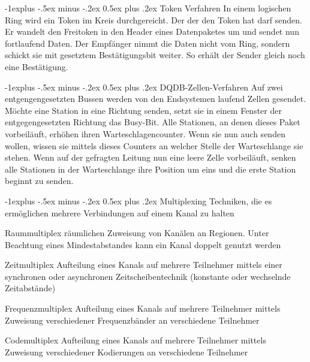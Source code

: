\documentclass[a4paper]{article}
\makeatletter
\renewcommand{\subsection}{\@startsection{subsection}{2}{0mm}%
                                {-1explus -.5ex minus -.2ex}%
                                {0.5ex plus .2ex}%
                                {\normalfont\normalsize\bfseries}}
\makeatother
\begin{document}
\begin{multicols}{3}
    \subsection{Token Verfahren}
    In einem logischen Ring wird ein Token im Kreis durchgereicht. Der der den Token hat darf senden. Er wandelt den Freitoken in den Header eines Datenpaketes um und sendet nun fortlaufend Daten. Der Empfänger nimmt die Daten nicht vom Ring, sondern schickt sie mit gesetztem Bestätigungsbit weiter. So erhält der Sender gleich noch eine Bestätigung.
    
    \subsection{DQDB-Zellen-Verfahren}
    Auf zwei entgengengesetzten Bussen werden von den Endsystemen laufend Zellen gesendet. Möchte eine Station in eine Richtung senden, setzt sie in einem Fenster der entgegengesetzten Richtung das Busy-Bit. Alle Stationen, an denen dieses Paket vorbeiläuft, erhöhen ihren Warteschlagencounter. Wenn sie nun auch senden wollen, wissen sie mittels dieses Counters an welcher Stelle der Warteschlange sie stehen. Wenn auf der gefragten Leitung nun eine leere Zelle vorbeiläuft, senken alle Stationen in der Warteschlange ihre Position um eins und die erste Station beginnt zu senden.
    
    \subsection{Multiplexing}
    Techniken, die es ermöglichen mehrere Verbindungen auf einem Kanal zu halten
    \begin{description*}
        \item[Raummultiplex] räumlichen Zuweisung von Kanälen an Regionen. Unter Beachtung eines Mindestabstandes kann ein Kanal doppelt genutzt werden
        \item[Zeitmultiplex] Aufteilung eines Kanals auf mehrere Teilnehmer mittels einer synchronen oder asynchronen Zeitscheibentechnik (konstante oder wechselnde Zeitabstände)
        \item[Frequenzmultiplex] Aufteilung eines Kanals auf mehrere Teilnehmer mittels Zuweisung verschiedener Frequenzbänder an verschiedene Teilnehmer
        \item[Codemultiplex] Aufteilung eines Kanals auf mehrere Teilnehmer mittels Zuweisung verschiedener Kodierungen an verschiedene Teilnehmer
    \end{description*}
    

\end{multicols}
\end{document}
